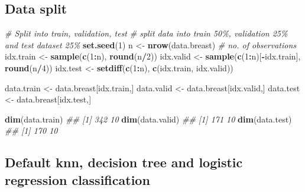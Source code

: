 \documentclass[
]{book}
\newenvironment{Shaded}{\begin{snugshade}}{\end{snugshade}}
\newcommand{\CommentTok}[1]{\textcolor[rgb]{0.56,0.35,0.01}{\textit{#1}}}
\newcommand{\DecValTok}[1]{\textcolor[rgb]{0.00,0.00,0.81}{#1}}
\newcommand{\KeywordTok}[1]{\textcolor[rgb]{0.13,0.29,0.53}{\textbf{#1}}}
\newcommand{\NormalTok}[1]{#1}
\newcommand{\OperatorTok}[1]{\textcolor[rgb]{0.81,0.36,0.00}{\textbf{#1}}}
\newcommand{\StringTok}[1]{\textcolor[rgb]{0.31,0.60,0.02}{#1}}
\theoremstyle{definition}
\theoremstyle{definition}
\theoremstyle{definition}
\theoremstyle{remark}
\begin{document}
\hypertarget{data-split}{%
\subsection{Data split}\label{data-split}}

\begin{Shaded}
\begin{Highlighting}[]
\CommentTok{\# Split into train, validation, test}
\CommentTok{\# split data into train 50\%, validation 25\% and test dataset 25\%}
\KeywordTok{set.seed}\NormalTok{(}\DecValTok{1}\NormalTok{)}
\NormalTok{n \textless{}{-}}\StringTok{ }\KeywordTok{nrow}\NormalTok{(data.breast) }\CommentTok{\# no. of observations}
\NormalTok{idx.train \textless{}{-}}\StringTok{ }\KeywordTok{sample}\NormalTok{(}\KeywordTok{c}\NormalTok{(}\DecValTok{1}\OperatorTok{:}\NormalTok{n), }\KeywordTok{round}\NormalTok{(n}\OperatorTok{/}\DecValTok{2}\NormalTok{))}
\NormalTok{idx.valid \textless{}{-}}\StringTok{ }\KeywordTok{sample}\NormalTok{(}\KeywordTok{c}\NormalTok{(}\DecValTok{1}\OperatorTok{:}\NormalTok{n)[}\OperatorTok{{-}}\NormalTok{idx.train], }\KeywordTok{round}\NormalTok{(n}\OperatorTok{/}\DecValTok{4}\NormalTok{))}
\NormalTok{idx.test \textless{}{-}}\StringTok{ }\KeywordTok{setdiff}\NormalTok{(}\KeywordTok{c}\NormalTok{(}\DecValTok{1}\OperatorTok{:}\NormalTok{n), }\KeywordTok{c}\NormalTok{(idx.train, idx.valid))}

\NormalTok{data.train \textless{}{-}}\StringTok{ }\NormalTok{data.breast[idx.train,]}
\NormalTok{data.valid \textless{}{-}}\StringTok{ }\NormalTok{data.breast[idx.valid,]}
\NormalTok{data.test \textless{}{-}}\StringTok{ }\NormalTok{data.breast[idx.test,]}

\KeywordTok{dim}\NormalTok{(data.train)}
\CommentTok{\#\# [1] 342  10}
\KeywordTok{dim}\NormalTok{(data.valid)}
\CommentTok{\#\# [1] 171  10}
\KeywordTok{dim}\NormalTok{(data.test)}
\CommentTok{\#\# [1] 170  10}
\end{Highlighting}
\end{Shaded}

\hypertarget{default-knn-decision-tree-and-logistic-regression-classification}{%
\subsection{Default knn, decision tree and logistic regression classification}\label{default-knn-decision-tree-and-logistic-regression-classification}}
\end{document}
